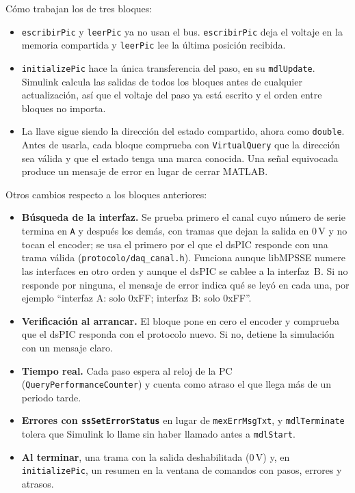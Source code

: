 \documentclass[11pt]{article}
\newcommand{\code}[1]{\texttt{#1}}
\begin{document}
Cómo trabajan los de tres bloques:

\begin{itemize}
\item \code{escribirPic} y \code{leerPic} ya no usan el bus. \code{escribirPic}
  deja el voltaje en la memoria compartida y \code{leerPic} lee la última
  posición recibida.
\item \code{initializePic} hace la única transferencia del paso, en su
  \code{mdlUpdate}. Simulink calcula las salidas de todos los bloques antes de
  cualquier actualización, así que el voltaje del paso ya está escrito y el
  orden entre bloques no importa.
\item La llave sigue siendo la dirección del estado compartido, ahora como
  \code{double}. Antes de usarla, cada bloque comprueba con
  \code{VirtualQuery} que la dirección sea válida y que el estado tenga una
  marca conocida. Una señal equivocada produce un mensaje de error en lugar de
  cerrar MATLAB.
\end{itemize}

Otros cambios respecto a los bloques anteriores:

\begin{itemize}
\item \textbf{Búsqueda de la interfaz.} Se prueba primero el canal cuyo
  número de serie termina en \code{A} y después los demás, con tramas que
  dejan la salida en 0\,V y no tocan el encoder; se usa el primero por el que
  el dsPIC responde con una trama válida (\code{protocolo/daq\_canal.h}).
  Funciona aunque libMPSSE numere las interfaces en otro orden y aunque el
  dsPIC se cablee a la interfaz~B. Si no responde por ninguna, el mensaje de
  error indica qué se leyó en cada una, por ejemplo ``interfaz A: solo 0xFF;
  interfaz B: solo 0xFF''.
\item \textbf{Verificación al arrancar.} El bloque pone en cero el encoder y
  comprueba que el dsPIC responda con el protocolo nuevo. Si no, detiene la
  simulación con un mensaje claro.
\item \textbf{Tiempo real.} Cada paso espera al reloj de la PC
  (\code{QueryPerformanceCounter}) y cuenta como atraso el que llega más de un
  periodo tarde.
\item \textbf{Errores con \code{ssSetErrorStatus}} en lugar de
  \code{mexErrMsgTxt}, y \code{mdlTerminate} tolera que Simulink lo llame sin
  haber llamado antes a \code{mdlStart}.
\item \textbf{Al terminar}, una trama con la salida deshabilitada (0\,V) y, en
  \code{initializePic}, un resumen en la ventana de comandos con pasos,
  errores y atrasos.
\end{itemize}
\end{document}

